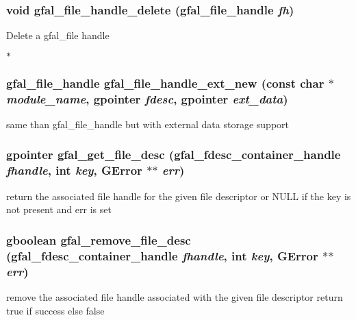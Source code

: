 \subsubsection{\setlength{\rightskip}{0pt plus 5cm}void gfal\_\-file\_\-handle\_\-delete (gfal\_\-file\_\-handle {\em fh})}\label{gfal__common__filedescriptor_8h_161698b3aec533e12f608111b8da5c2f}


Delete a gfal\_\-file handle

$\ast$ 
\subsubsection{\setlength{\rightskip}{0pt plus 5cm}gfal\_\-file\_\-handle gfal\_\-file\_\-handle\_\-ext\_\-new (const char $\ast$ {\em module\_\-name}, gpointer {\em fdesc}, gpointer {\em ext\_\-data})}\label{gfal__common__filedescriptor_8h_a55408b4cba00997f0c034d5aeffa641}


same than gfal\_\-file\_\-handle but with external data storage support 
\subsubsection{\setlength{\rightskip}{0pt plus 5cm}gpointer gfal\_\-get\_\-file\_\-desc (gfal\_\-fdesc\_\-container\_\-handle {\em fhandle}, int {\em key}, GError $\ast$$\ast$ {\em err})}\label{gfal__common__filedescriptor_8h_91568ee8206643b36d685269b012eb45}


return the associated file handle for the given file descriptor or NULL if the key is not present and err is set 
\subsubsection{\setlength{\rightskip}{0pt plus 5cm}gboolean gfal\_\-remove\_\-file\_\-desc (gfal\_\-fdesc\_\-container\_\-handle {\em fhandle}, int {\em key}, GError $\ast$$\ast$ {\em err})}\label{gfal__common__filedescriptor_8h_4b10e1d3a5ffde849302fffdba207835}


remove the associated file handle associated with the given file descriptor return true if success else false 